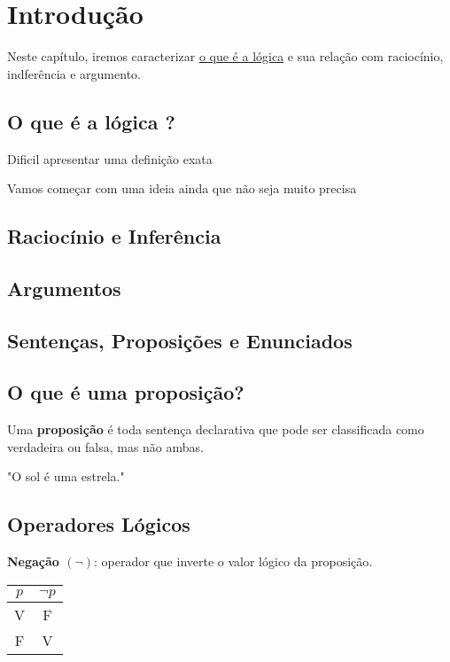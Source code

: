 \section{Introdução}
Neste capítulo, iremos caracterizar \underline{o que é a lógica} e sua relação com raciocínio, indferência 
e argumento.

\subsection{O que é a lógica ?}
Dificil apresentar uma definição exata

Vamos começar com uma ideia ainda que não seja muito precisa



\subsection{Raciocínio e Inferência}

\subsection{Argumentos}

\subsection{Sentenças, Proposições e Enunciados}


\subsection{O que é uma proposição?}
\begin{defbox}
Uma \textbf{proposição} é toda sentença declarativa que pode ser classificada como verdadeira ou falsa, mas não ambas.
\end{defbox}

\begin{examplebox}
"O sol é uma estrela."
\end{examplebox}

\subsection{Operadores Lógicos}
\begin{defbox}
\textbf{Negação $(\neg)$}: operador que inverte o valor lógico da proposição.
\end{defbox}

\begin{ttbox}
\begin{tabular}{c|c}
$p$ & $\neg p$ \\
\hline
V & F \\
F & V \\
\end{tabular}
\end{ttbox}

